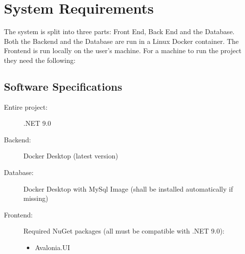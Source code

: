 \section{System Requirements}
\hspace*{1cm}The system is split into three parts: Front End, Back End and the Database. Both the Backend and the Database are run in a Linux Docker container. The Frontend is run locally on the user's machine. For a machine to run the project they need the following:

\subsection*{Software Specifications}
\begin{description}
    \item[Entire project:] .NET 9.0
    \item[Backend:] Docker Desktop (latest version)
    \item[Database:] Docker Desktop with MySql Image (shall be installed automatically if missing)
    \item[Frontend:] Required NuGet packages (all must be compatible with .NET 9.0):
    \begin{itemize}
        \item Avalonia.UI
    \end{itemize}
\end{description}
